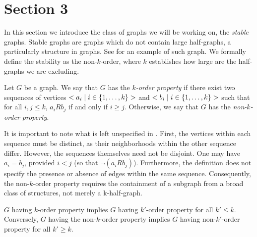 \section{Section 3} \label{sec:section_3}

    In this section we introduce the class of graphs we will be working on, the \emph{stable} graphs.
    Stable graphs are graphs which do not contain 
    large half-graphs, a particularly  structure in graphs. 
    See  for an example of such graph. 
    We formally define the stability as the non-$k$-order, where $k$ establishes how large are the half-graphs we are
    excluding.

    \begin{definition} \label{def:k_order_property}
        Let $G$ be a graph.
        We say that $G$ has the \emph{$k$-order property} if there exist two sequences of vertices
        $< a_i \mid i \in \{ 1, \dots, k \} >$ and $< b_i \mid i \in \{ 1, \dots, k \} >$ such that
        for all $i,j \leq k$, $a_i R b_j$ if and only if $i \geq j$.
        Otherwise, we say that $G$ has the \emph{non-$k$-order property}.
    \end{definition}

    \begin{remark}
        It is important to note what is left unspecified in .
        First, the vertices within each sequence must be distinct, as their neighborhoods within the other sequence
        differ.
        However, the sequences themselves need not be disjoint.
        One may have $a_i=b_j$, provided $i < j$ (so that $\neg(a_i R b_j)$).
        Furthermore, the definition does not specify the presence or absence of edges within the same sequence.
        Consequently, the non-$k$-order property requires the containment of a subgraph from a broad class of structures,
        not merely a k-half-graph.
    \end{remark}

    \begin{remark}
        $G$ having $k$-order property implies $G$ having $k'$-order property for all $k' \leq k$.
        Conversely, $G$ having the non-$k$-order property implies $G$ having non-$k'$-order property for all $k' \geq k$.
    \end{remark}

